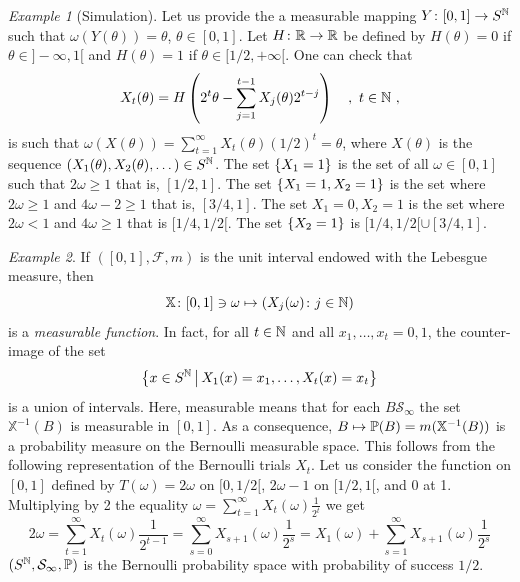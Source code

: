 \documentclass[12pt,a4paper]{amsart}
\theoremstyle{plain}%
\theoremstyle{definition}
\theoremstyle{remark}
\newtheorem{example}{Example}
\begin{document}
\bigskip
\begin{example}[Simulation]
Let us provide the a measurable mapping $Y \colon [0,1] \to S^{\mathbb{N}}$ such that $\omega(Y(\theta)) = \theta$, $\theta \in [0,1]$. Let $H \colon \mathbb{R} \to \mathbb{R}$ be defined by $H(\theta)=0$ if $\theta \in ]-\infty,1[$ and $H(\theta)=1$ if $\theta \in [1/2,+\infty[$. One can check that
\begin{equation*}
  X_t(\theta) = H\left(2^t\theta - \sum_{j=1}^{t-1} X_j(\theta)2^{t-j} \right) \quad , \ t \in \N \ ,
\end{equation*}
is such that $\omega(X(\theta)) = \sum_{t=1}^\infty X_t(\theta) (1/2)^t = \theta$, where $X(\theta)$ is the sequence $(X_1(\theta), X_2(\theta), \dots) \in S^{\mathbb{N}}$. The set $\left\{X_1 = 1\right\}$ is the set of all $\omega \in [0,1]$ such that $2\omega \geq 1$ that is, $[1/2,1]$. The set $\left\{X_1 = 1, X_2=1\right\}$ is the set where $2\omega \geq 1$ and $4\omega - 2 \geq 1$ that is, $[3/4,1]$. The set ${X_1=0,X_2=1}$ is the set where $2\omega < 1$ and $4\omega \geq 1$ that is $[1/4,1/2[$. The set $\left\{X_2=1\right\}$ is $[1/4,1/2[ \cup [3/4,1]$.  
\end{example}

\bigskip

\begin{example} If $([0,1],\mathcal F,m)$ is the unit interval endowed with the Lebesgue measure, then
  \begin{equation*}
    \mathbb X \colon [0,1] \ni \omega \mapsto (X_j(\omega) \colon j \in \mathbb{N})
  \end{equation*}
is a \emph{measurable function}. In fact, for all $t \in \mathbb{N}$ and all $x_1,\dots,x_t = 0,1$, the counter-image of the set
\begin{equation*}
  \left\{x \in S^{\mathbb{N}} \, \middle| \, X_1(x)=x_1,\dots,X_t(x)=x_t \right\}
\end{equation*}
is a union of intervals. Here, measurable means that for each $B \mathcal S_\infty$ the set $\mathbb X^{-1}(B)$ is measurable in $[0,1]$. As a consequence, $B \mapsto \operatorname{\mathbb P}(B) = m(\mathbb X^{-1}(B))$ is a probability measure on the Bernoulli measurable space. This follows from the following representation of the Bernoulli trials $X_t$. Let us consider the function on $[0,1]$ defined by $T(\omega) = 2\omega$ on $[0,1/2[$, $2\omega-1$ on $[1/2,1[$, and 0 at 1. Multiplying by 2 the equality $\omega = \sum_{t=1}^\infty X_t(\omega) \frac1{2^t}$ we get
\begin{equation*}
  2\omega = \sum_{t=1}^\infty X_t(\omega) \frac1{2^{t-1}} = \sum_{s=0}^\infty X_{s+1}(\omega) \frac1{2^{s}} = X_1(\omega) + \sum_{s=1}^\infty X_{s+1}(\omega) \frac1{2^{s}} 
\end{equation*}
$(S^{\mathbb{N}},\mathcal S_\infty,\operatorname{\mathbb P})$ is the Bernoulli probability space with probability of success $1/2$.
\end{example}
\end{document}
